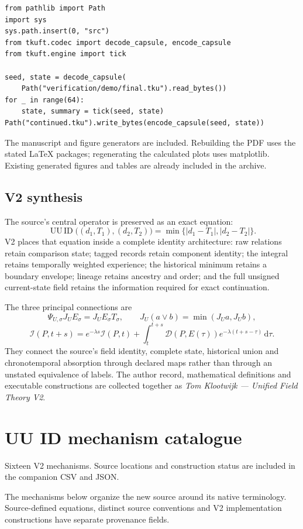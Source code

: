 \documentclass[11pt,a4paper]{article}
\numberwithin{equation}{section}
\newcommand{\newsec}[1]{\clearpage\section{#1}}
\newcommand{\origin}[1]{{\sffamily\small\color{slate}#1}\par\vspace{3pt}}
\newcommand{\uu}{\operatorname{UU\,ID}}
\newcommand{\dd}{\mathrm d}
\begin{document}
\begin{lstlisting}
from pathlib import Path
import sys
sys.path.insert(0, "src")
from tkuft.codec import decode_capsule, encode_capsule
from tkuft.engine import tick

seed, state = decode_capsule(
    Path("verification/demo/final.tku").read_bytes())
for _ in range(64):
    state, summary = tick(seed, state)
Path("continued.tku").write_bytes(encode_capsule(seed, state))
\end{lstlisting}
The manuscript and figure generators are included. Rebuilding the PDF uses the stated LaTeX packages; regenerating the calculated plots uses matplotlib. Existing generated figures and tables are already included in the archive.

\clearpage
\subsection{V2 synthesis}
The source's central operator is preserved as an exact equation:
\begin{equation}
\uu\big((d_1,T_1),(d_2,T_2)\big)=
\min\{|d_1-T_1|,|d_2-T_2|\}.
\end{equation}
V2 places that equation inside a complete identity architecture: raw relations retain comparison state; tagged records retain component identity; the integral retains temporally weighted experience; the historical minimum retains a boundary envelope; lineage retains ancestry and order; and the full unsigned current-state field retains the information required for exact continuation.

The three principal connections are
\begin{equation}
\Psi_{U,\sigma}J_UE_\sigma=J_UE_\sigma T_\sigma,
\qquad J_U(a\lor b)=\min(J_Ua,J_Ub),
\end{equation}
\begin{equation}
\mathcal I(P,t+s)=e^{-\lambda s}\mathcal I(P,t)
+\int_t^{t+s}\mathcal D(P,E(\tau))e^{-\lambda(t+s-\tau)}\,\dd\tau.
\end{equation}
They connect the source's field identity, complete state, historical union and chronotemporal absorption through declared maps rather than through an unstated equivalence of labels. The author record, mathematical definitions and executable constructions are collected together as \emph{Tom Klootwijk --- Unified Field Theory V2}.

\appendix
\newsec{UU ID mechanism catalogue}
\label{app:uu}
\origin{Sixteen V2 mechanisms. Source locations and construction status are included in the companion CSV and JSON.}
The mechanisms below organize the new source around its native terminology. Source-defined equations, distinct source conventions and V2 implementation constructions have separate provenance fields.
{\small}
\end{document}
